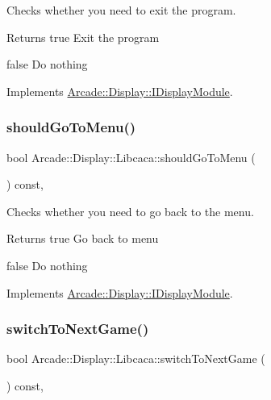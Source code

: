 Checks whether you need to exit the program. 

\begin{DoxyReturn}{Returns}
true Exit the program 

false Do nothing 
\end{DoxyReturn}


Implements \mbox{\hyperlink{classArcade_1_1Display_1_1IDisplayModule_a550877fb92d58325404b9ebe9e71f6ff}{Arcade\+::\+Display\+::\+I\+Display\+Module}}.

\mbox{\label{classArcade_1_1Display_1_1Libcaca_aaa4a4a114dee18576dd93ca09808004e}} 
\subsubsection{\texorpdfstring{shouldGoToMenu()}{shouldGoToMenu()}}
{\footnotesize\ttfamily bool Arcade\+::\+Display\+::\+Libcaca\+::should\+Go\+To\+Menu (\begin{DoxyParamCaption}{ }\end{DoxyParamCaption}) const\hspace{0.3cm}{\ttfamily [final]}, {\ttfamily [virtual]}}



Checks whether you need to go back to the menu. 

\begin{DoxyReturn}{Returns}
true Go back to menu 

false Do nothing 
\end{DoxyReturn}


Implements \mbox{\hyperlink{classArcade_1_1Display_1_1IDisplayModule_ad060f6b99f2adffaf02a4226fc40d0ab}{Arcade\+::\+Display\+::\+I\+Display\+Module}}.

\mbox{\label{classArcade_1_1Display_1_1Libcaca_ab9f5be320196e902e43db50e0cdcce5e}} 
\subsubsection{\texorpdfstring{switchToNextGame()}{switchToNextGame()}}
{\footnotesize\ttfamily bool Arcade\+::\+Display\+::\+Libcaca\+::switch\+To\+Next\+Game (\begin{DoxyParamCaption}{ }\end{DoxyParamCaption}) const\hspace{0.3cm}{\ttfamily [final]}, {\ttfamily [virtual]}}



